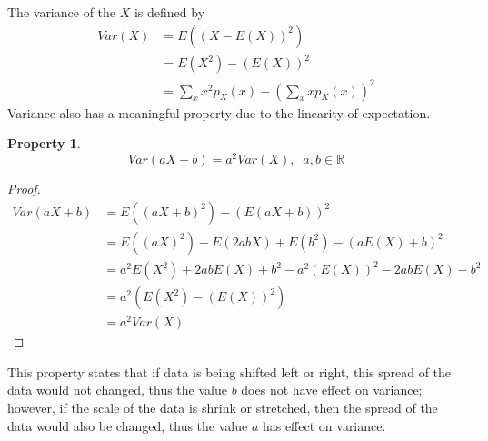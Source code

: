 \documentclass{article}
\newtheorem{property}{Property}
\begin{document}
The variance of the $X$ is defined by
\begin{align*}
 Var(X) &= E\left((X-E(X))^2 \right)\\ 
 &= E(X^2) - (E(X))^2\\ 
 &= \sum_x x^2p_X(x) - \left(\sum_x xp_X(x) \right)^2
\end{align*}
Variance also has a meaningful property due to the linearity of expectation.
\begin{property}
	\[ Var(aX+b) = a^2Var(X),\;\;a,b\in\mathbb{R} \]
\end{property}
\begin{proof}
	\begin{align*}
	Var(aX+b) &=  E((aX+b)^2) - (E(aX+b))^2\\
	&= E((aX)^2) + E(2abX) + E(b^2) - (aE(X)+b)^2\\
	&= a^2E(X^2) + 2abE(X) + b^2 - a^2(E(X))^2 - 2abE(X) -b^2\\
	&= a^2(E(X^2) - (E(X))^2)\\
	&= a^2Var(X)
	\end{align*}	
\end{proof}
This property states that if data is being shifted left or right, this spread of the data would not changed, thus the value $b$ does not have effect on variance; however, if the scale of the data is shrink or stretched, then the spread of the data would also be changed, thus the value $a$ has effect on variance. 
\end{document}
